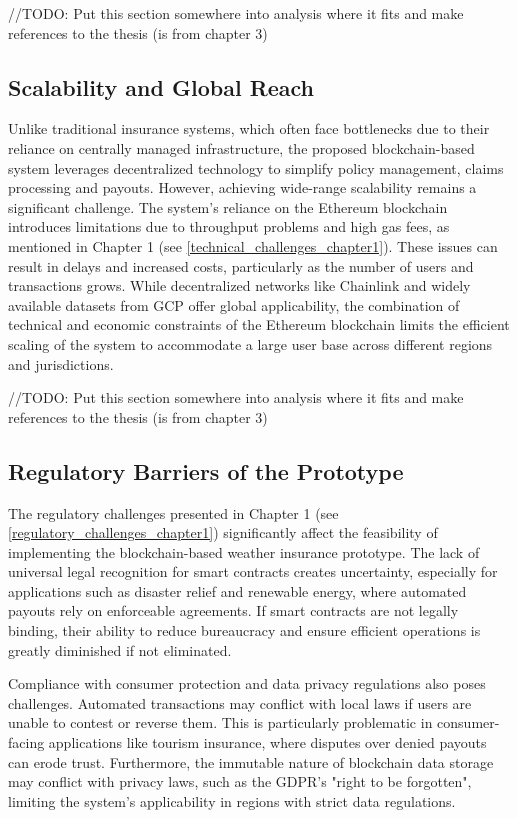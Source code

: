 //TODO: Put this section somewhere into analysis where it fits and make references to the thesis (is from chapter 3)
\subsection{Scalability and Global Reach}\label{scalability_global_reach}
Unlike traditional insurance systems, which often face bottlenecks due to their reliance on centrally managed infrastructure, the proposed blockchain-based system leverages decentralized technology to simplify policy management, claims processing and payouts. However, achieving wide-range scalability remains a significant challenge. The system's reliance on the Ethereum blockchain introduces limitations due to throughput problems and high gas fees, as mentioned in Chapter 1 (see \cref{technical_challenges_chapter1}). These issues can result in delays and increased costs, particularly as the number of users and transactions grows. While decentralized networks like Chainlink and widely available datasets from GCP offer global applicability, the combination of technical and economic constraints of the Ethereum blockchain limits the efficient scaling of the system to accommodate a large user base across different regions and jurisdictions.

//TODO: Put this section somewhere into analysis where it fits and make references to the thesis (is from chapter 3)
\subsection{Regulatory Barriers of the Prototype}
The regulatory challenges presented in Chapter 1 (see \cref{regulatory_challenges_chapter1}) significantly affect the feasibility of implementing the blockchain-based weather insurance prototype. The lack of universal legal recognition for smart contracts creates uncertainty, especially for applications such as disaster relief and renewable energy, where automated payouts rely on enforceable agreements. If smart contracts are not legally binding, their ability to reduce bureaucracy and ensure efficient operations is greatly diminished if not eliminated.

Compliance with consumer protection and data privacy regulations also poses challenges. Automated transactions may conflict with local laws if users are unable to contest or reverse them. This is particularly problematic in consumer-facing applications like tourism insurance, where disputes over denied payouts can erode trust. Furthermore, the immutable nature of blockchain data storage may conflict with privacy laws, such as the GDPR's "right to be forgotten", limiting the system's applicability in regions with strict data regulations.

